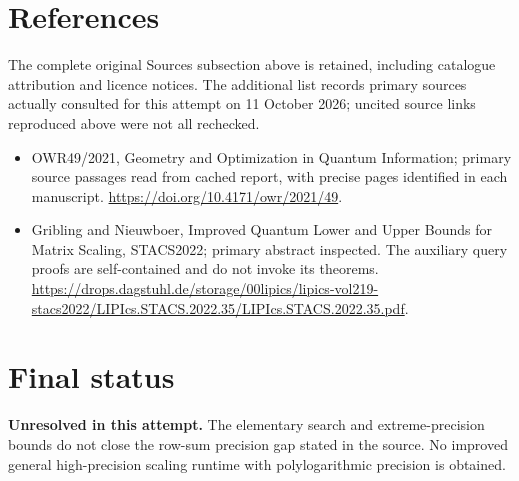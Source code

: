 \documentclass[11pt]{article}
\begin{document}
\section{References}
The complete original Sources subsection above is retained, including catalogue attribution and licence notices. The additional list records primary sources actually consulted for this attempt on 11 October 2026; uncited source links reproduced above were not all rechecked.
\begin{itemize}
\item OWR49/2021, Geometry and Optimization in Quantum Information; primary source passages read from cached report, with precise pages identified in each manuscript. \url{https://doi.org/10.4171/owr/2021/49}.
\item Gribling and Nieuwboer, Improved Quantum Lower and Upper Bounds for Matrix Scaling, STACS2022; primary abstract inspected. The auxiliary query proofs are self-contained and do not invoke its theorems. \url{https://drops.dagstuhl.de/storage/00lipics/lipics-vol219-stacs2022/LIPIcs.STACS.2022.35/LIPIcs.STACS.2022.35.pdf}.
\end{itemize}
\section{Final status}
\textbf{Unresolved in this attempt.} The elementary search and extreme-precision bounds do not close the row-sum precision gap stated in the source. No improved general high-precision scaling runtime with polylogarithmic precision is obtained.
\end{document}
